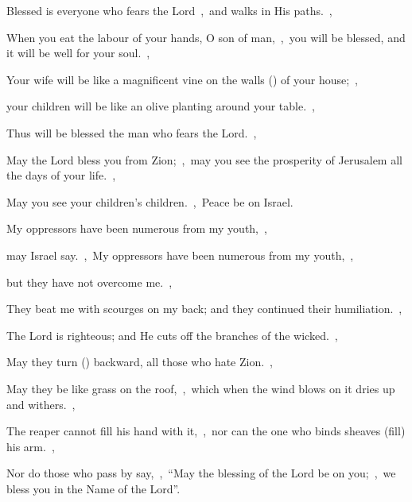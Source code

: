 \documentclass[12pt,twoside,a5paper]{article}
\begin{document}
\begin{normalparskip}
  Blessed is everyone who fears the Lord~\sep\ and walks in His paths.~\sep


  When you eat the labour of your hands, O son of man,~\sep\ you will be blessed, and it will be well for your soul.~\sep

  Your wife will be like a magnificent vine on the walls () of your house;~\sep

  your children will be like an olive planting around your table.~\sep

  Thus will be blessed the man who fears the Lord.~\sep

  May the Lord bless you from Zion;~\sep\ may you see the prosperity of Jerusalem all the days of your life.~\sep

  May you see your children's children.~\sep\ Peace be on Israel.
\end{normalparskip}


\begin{normalparskip}
  My oppressors have been numerous from my youth,~\sep

  may Israel say.~\sep\ My oppressors have been numerous from my youth,~\sep


  but they have not overcome me.~\sep

  They beat me with scourges on my back; and they continued their humiliation.~\sep

  The Lord is righteous; and He cuts off the branches of the wicked.~\sep

  May they turn () backward, all those who hate Zion.~\sep

  May they be like grass on the roof,~\sep\ which when the wind blows on it dries up and withers.~\sep

  The reaper cannot fill his hand with it,~\sep\ nor can the one who binds sheaves (fill) his arm.~\sep

  Nor do those who pass by say,~\sep\ ``May the blessing of the Lord be on you;~\sep\ we bless you in the Name of the Lord''.
\end{normalparskip}

\end{document}
